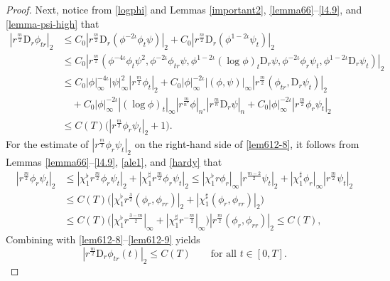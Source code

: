 \documentclass[11pt,reqno]{amsart}
\numberwithin{rk}{section}
\numberwithin{prop}{section}
\numberwithin{mydef}{section}
\numberwithin{lem}{section}
\numberwithin{equation}{section}
\numberwithin{thm}{section}
\begin{document}
\begin{proof}
Next, notice from \eqref{logphi} and Lemmas \ref{important2}, \ref{lemma66}--\ref{l4.9}, and \ref{lemma-psi-high} that
\begin{equation}\label{lem612-8}
\begin{aligned}
|r^\frac{m}{2}\mathrm{D}_r\phi_{tr} |_2&\leq C_0|r^\frac{m}{2}\mathrm{D}_r(\phi^{-2\iota}\phi_t\psi)|_2+C_0|r^\frac{m}{2}\mathrm{D}_r(\phi^{1-2\iota}\psi_t)|_2\\
&\leq C_0|r^\frac{m}{2}(\phi^{-4\iota}\phi_t \psi^2,\phi^{-2\iota}\phi_{tr}\psi,\phi^{1-2\iota}(\log\phi)_t\mathrm{D}_r\psi, \phi^{-2\iota}\phi_r\psi_t,\phi^{1-2\iota} \mathrm{D}_r\psi_t)|_2\\
&\leq C_0|\phi|_\infty^{-4\iota}|\psi|_\infty^2 |r^\frac{m}{2}\phi_t|_2+C_0|\phi|_\infty^{-2\iota}|(\phi,\psi)|_\infty |r^\frac{m}{2}(\phi_{tr},\mathrm{D}_r\psi_{t})|_2 \\
&\quad +C_0|\phi|_\infty^{-2\iota} |(\log\phi)_t|_\infty|r^\frac{m}{n^*}\phi|_{n^*} |r^\frac{m}{n}\mathrm{D}_r\psi|_n+C_0|\phi|_\infty^{-2\iota}|r^\frac{m}{2}\phi_r\psi_t|_2\\
&\leq C(T)\big(|r^\frac{m}{2}\phi_r\psi_t|_2+1\big).
\end{aligned}
\end{equation}
For the estimate of $|r^\frac{m}{2}\phi_r\psi_t|_2$ on the right-hand side of \eqref{lem612-8}, it follows from Lemmas \ref{lemma66}--\ref{l4.9}, \ref{ale1}, and \ref{hardy} that
\begin{equation}\label{lem612-9}
\begin{aligned}
|r^\frac{m}{2}\phi_r\psi_t|_2&\leq |\chi_1^\flat r^\frac{m}{2}\phi_r\psi_t|_2+|\chi_1^\sharp r^\frac{m}{2}\phi_r\psi_t|_2 \leq  |\chi_1^\flat r\phi_r|_\infty|r^\frac{m-2}{2}\psi_t|_2+|\chi_1^\sharp \phi_r|_\infty|r^\frac{m}{2}\psi_t|_2\\
&\leq  C(T)\big(|\chi_1^\flat r^\frac{3}{2}(\phi_r,\phi_{rr})|_2+|\chi_1^\sharp (\phi_r,\phi_{rr})|_2\big) \\
&\leq  C(T)\big(|\chi_1^\flat r^\frac{3-m}{2}|_\infty+ |\chi_1^\sharp r^{-\frac{m}{2}}|_\infty\big) |r^\frac{m}{2}(\phi_r,\phi_{rr})|_2\leq C(T),    
\end{aligned}
\end{equation}
Combining with \eqref{lem612-8}--\eqref{lem612-9} yields
\begin{equation}\label{lem612-10}
|r^\frac{m}{2}\mathrm{D}_r\phi_{tr}(t)|_2\leq C(T)\qquad \text{for all $t\in [0,T]$}.
\end{equation}


\end{proof}
\end{document}
